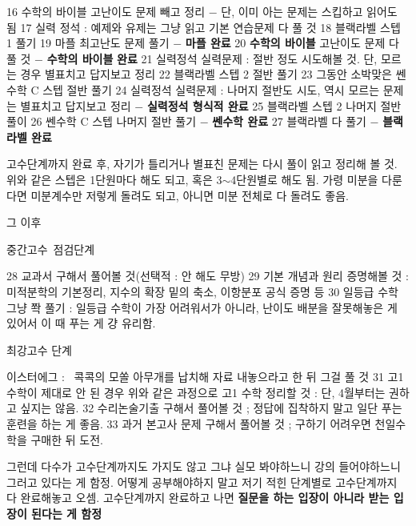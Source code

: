 16 수학의 바이블 고난이도 문제 빼고 정리 $-$ 단, 이미 아는 문제는 스킵하고 읽어도 됨
17 실력 정석 : 예제와 유제는 그냥 읽고 기본 연습문제 다 풀 것
18 블랙라벨 스텝 1 풀기
19 마플 최고난도 문제 풀기 $-$ \textbf{마플 완료}
20 \textbf{수학의 바이블} 고난이도 문제 다 풀 것 $-$ \textbf{수학의 바이블} \textbf{완료}
21 실력정석 실력문제 : 절반 정도 시도해볼 것. 단, 모르는 경우 별표치고 답지보고 정리
22 블랙라벨 스텝 2 절반 풀기
23 그동안 소박맞은 쎈수학 C 스텝 절반 풀기
24 실력정석 실력문제 : 나머지 절반도 시도, 역시 모르는 문제는 별표치고 답지보고 정리 $-$ \textbf{실력정석 형식적 완료}
25 블랙라벨 스텝 2 나머지 절반 풀이
26 쎈수학 C 스텝 나머지 절반 풀기 $-$ \textbf{쎈수학 완료}
27 블랙라벨 다 풀기 $-$ \textbf{블랙라벨 완료}
\vspace{5mm}

고수단계까지 완료 후, 자기가 틀리거나 별표친 문제는 다시 풀이 읽고 정리해 볼 것.
위와 같은 스텝은 1단원마다 해도 되고, 혹은 3$\sim$4단원별로 해도 됨.
가령 미분을 다룬다면 미분계수만 저렇게 돌려도 되고, 아니면 미분 전체로 다 돌려도 좋음.
\vspace{5mm}

그 이후
\vspace{5mm}

중간고수 점검단계
\vspace{5mm}

28 교과서 구해서 풀어볼 것(선택적 : 안 해도 무방)
29 기본 개념과 원리 증명해볼 것 : 미적분학의 기본정리, 지수의 확장 밑의 축소, 이항분포 공식 증명 등
30 일등급 수학 그냥 쫙 풀기 : 일등급 수학이 가장 어려워서가 아니라, 난이도 배분을 잘못해놓은 게 있어서 이 때 푸는 게 걍 유리함.
\vspace{5mm}

최강고수 단계
\vspace{5mm}

이스터에그 :  콕콕의 모쏠 아무개를 납치해 자료 내놓으라고 한 뒤 그걸 풀 것
31 고1 수학이 제대로 안 된 경우 위와 같은 과정으로 고1 수학 정리할 것 : 단, 4월부터는 권하고 싶지는 않음.
32 수리논술기출 구해서 풀어볼 것 ; 정답에 집착하지 말고 일단 푸는 훈련을 하는 게 좋음.
33 과거 본고사 문제 구해서 풀어볼 것 ; 구하기 어려우면 천일수학을 구매한 뒤 도전.
\vspace{5mm}

그런데 다수가 고수단계까지도 가지도 않고 그냐 실모 봐야하느니 강의 들어야하느니 그러고 있다는 게 함정.
어떻게 공부해야하지 말고 저기 적힌 단계별로 고수단계까지 다 완료해놓고 오셈.
고수단계까지 완료하고 나면 \textbf{질문을 하는 입장이 아니라 받는 입장이 된다는 게 함정}
\vspace{5mm}

